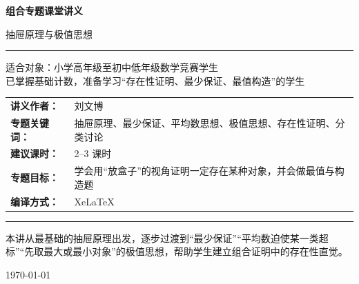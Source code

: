 \documentclass[11pt,a4paper,fontset=fandol]{ctexart}
\theoremstyle{formaltheorem}
\theoremstyle{formalexample}
\begin{document}
\thispagestyle{empty}
\begin{titlepage}
\centering
\vspace*{0.9cm}

\begin{tcolorbox}[
  enhanced,
  width=0.92\textwidth,
  colback=white,
  colframe=mainblue,
  boxrule=1pt,
  arc=0mm,
  left=6mm,
  right=6mm,
  top=8mm,
  bottom=8mm
]
\centering

{\fontsize{24}{30}\selectfont\bfseries 组合专题课堂讲义\par}
\vspace{0.7cm}
{\fontsize{17}{22}\selectfont 抽屉原理与极值思想\par}

\vspace{1.1cm}
\color{rulegray}\rule{0.72\textwidth}{0.7pt}\par
\vspace{1cm}

\begin{tcolorbox}[colback=lightblue,colframe=mainblue,width=0.82\textwidth,boxrule=1pt]
\centering
{\Large 适合对象：小学高年级至初中低年级数学竞赛学生}\\[0.4em]
{\large 已掌握基础计数，准备学习“存在性证明、最少保证、最值构造”的学生}
\end{tcolorbox}

\vspace{1.2cm}

\renewcommand{\arraystretch}{1.42}
\begin{tabular}{>{\bfseries}p{3.5cm}p{8cm}}
讲义作者： & 刘文博 \\
专题关键词： & 抽屉原理、最少保证、平均数思想、极值思想、存在性证明、分类讨论 \\
建议课时： & 2--3 课时 \\
专题目标： & 学会用“放盒子”的视角证明一定存在某种对象，并会做最值与构造题 \\
编译方式： & XeLaTeX \\
\end{tabular}

\vspace{1.2cm}
\color{rulegray}\rule{0.72\textwidth}{0.7pt}\par
\vspace{0.8cm}

{\normalsize 本讲从最基础的抽屉原理出发，逐步过渡到“最少保证”“平均数迫使某一类超标”“先取最大或最小对象”的极值思想，帮助学生建立组合证明中的存在性直觉。\par}

\vspace{0.5cm}
{\large \today\par}
\end{tcolorbox}
\end{titlepage}
\end{document}
